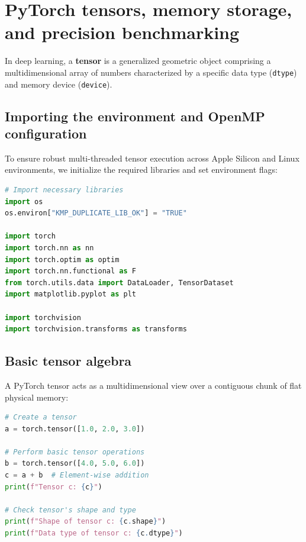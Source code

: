\documentclass[../labs.tex]{subfiles}
\begin{document}
\section{PyTorch tensors, memory storage, and precision benchmarking}

In deep learning, a \textbf{tensor} is a generalized geometric object comprising a multidimensional array of numbers characterized by a specific data type (\texttt{dtype}) and memory device (\texttt{device}).

\subsection{Importing the environment and OpenMP configuration}
To ensure robust multi-threaded tensor execution across Apple Silicon and Linux environments, we initialize the required libraries and set environment flags:

\begin{lstlisting}[language=Python, caption={Initial library imports and environment configuration (Cell 2).}, label={lst:lab01_imports}]
# Import necessary libraries
import os
os.environ["KMP_DUPLICATE_LIB_OK"] = "TRUE"

import torch
import torch.nn as nn
import torch.optim as optim
import torch.nn.functional as F
from torch.utils.data import DataLoader, TensorDataset
import matplotlib.pyplot as plt

import torchvision
import torchvision.transforms as transforms
\end{lstlisting}

\subsection{Basic tensor algebra}
A PyTorch tensor acts as a multidimensional view over a contiguous chunk of flat physical memory:

\begin{lstlisting}[language=Python, caption={Tensor creation, element-wise addition, and inspection (Cell 4).}, label={lst:lab01_tensor_basics}]
# Create a tensor
a = torch.tensor([1.0, 2.0, 3.0])

# Perform basic tensor operations
b = torch.tensor([4.0, 5.0, 6.0])
c = a + b  # Element-wise addition
print(f"Tensor c: {c}")

# Check tensor's shape and type
print(f"Shape of tensor c: {c.shape}")
print(f"Data type of tensor c: {c.dtype}")
\end{lstlisting}
\end{document}
